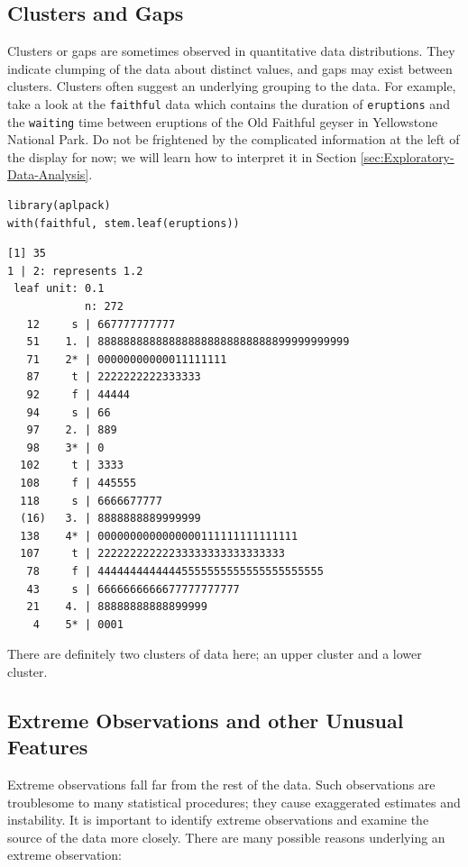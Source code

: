 \documentclass[captions=tableheading]{scrbook}
\begin{document}
\subsection{Clusters and Gaps}
\label{sec-2-2-4}

\label{sub:clusters-and-gaps}

Clusters or gaps are sometimes observed in quantitative data distributions. They indicate clumping of the data about distinct values, and gaps may exist between clusters. Clusters often suggest an underlying grouping to the data. For example, take a look at the \texttt{faithful} data which contains the duration of \texttt{eruptions} and the \texttt{waiting} time between eruptions of the Old Faithful geyser in Yellowstone National Park. Do not be frightened by the complicated information at the left of the display for now; we will learn how to interpret it in Section \ref{sec:Exploratory-Data-Analysis}.


\begin{verbatim}
library(aplpack)
with(faithful, stem.leaf(eruptions))
\end{verbatim}


\begin{verbatim}
[1] 35
1 | 2: represents 1.2
 leaf unit: 0.1
            n: 272
   12     s | 667777777777
   51    1. | 888888888888888888888888888899999999999
   71    2* | 00000000000011111111
   87     t | 2222222222333333
   92     f | 44444
   94     s | 66
   97    2. | 889
   98    3* | 0
  102     t | 3333
  108     f | 445555
  118     s | 6666677777
  (16)   3. | 8888888889999999
  138    4* | 0000000000000000111111111111111
  107     t | 22222222222233333333333333333
   78     f | 44444444444445555555555555555555555
   43     s | 6666666666677777777777
   21    4. | 88888888888899999
    4    5* | 0001
\end{verbatim}

There are definitely two clusters of data here; an upper cluster and a lower cluster. 
\subsection{Extreme Observations and other Unusual Features}
\label{sec-2-2-5}

\label{sub:Extreme-Observations-and}

Extreme observations fall far from the rest of the data. Such observations are troublesome to many statistical procedures; they cause exaggerated estimates and instability. It is important to identify extreme observations and examine the source of the data more closely. There are many possible reasons underlying an extreme observation:
\end{document}
